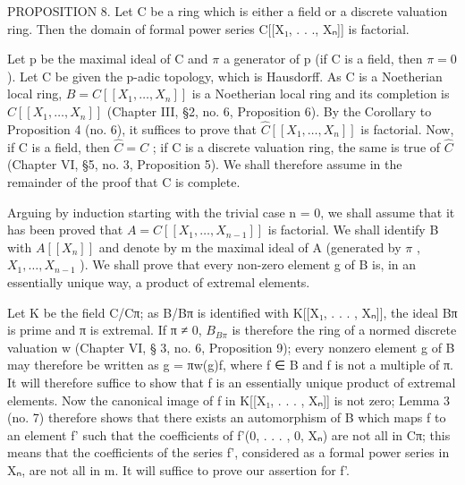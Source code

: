 PROPOSITION 8. Let C be a ring which is either a field or a discrete valuation ring. Then the domain of formal power series C{[}{[}X₁, . . ., Xₙ{]}{]} is factorial.

Let p be the maximal ideal of C and \(\pi\) a generator of p (if C is a field, then \(\pi = 0\) ). Let C be given the p-adic topology, which is Hausdorff. As C is a Noetherian local ring, \(B = C[[X_{1}, \ldots, X_{n}]]\) is a Noetherian local ring and its completion is \(\hat{C}[[X_{1}, \ldots, X_{n}]]\) (Chapter III, §2, no. 6, Proposition 6). By the Corollary to Proposition 4 (no. 6), it suffices to prove that \(\hat{C}[[X_{1}, \ldots, X_{n}]]\) is factorial. Now, if C is a field, then \(\hat{C} = C\) ; if C is a discrete valuation ring, the same is true of \(\hat{C}\) (Chapter VI, §5, no. 3, Proposition 5). We shall therefore assume in the remainder of the proof that C is complete.

Arguing by induction starting with the trivial case n = 0, we shall assume that it has been proved that \(A = C[[X_{1}, \ldots, X_{n-1}]]\) is factorial. We shall identify B with \(A[[X_{n}]]\) and denote by m the maximal ideal of A (generated by \(\pi\) , \(X_{1}, \ldots, X_{n-1}\) ). We shall prove that every non-zero element g of B is, in an essentially unique way, a product of extremal elements.

Let K be the field C/Cπ; as B/Bπ is identified with K{[}{[}X₁, . . . , Xₙ{]}{]}, the ideal Bπ is prime and π is extremal. If π ≠ 0, \(B_{B\pi}\) is therefore the ring of a normed discrete valuation w (Chapter VI, § 3, no. 6, Proposition 9); every nonzero element g of B may therefore be written as g = πw(g)f, where f ∈ B and f is not a multiple of π. It will therefore suffice to show that f is an essentially unique product of extremal elements. Now the canonical image of f in K{[}{[}X₁, . . . , Xₙ{]}{]} is not zero; Lemma 3 (no. 7) therefore shows that there exists an automorphism of B which maps f to an element f' such that the coefficients of f'(0, . . . , 0, Xₙ) are not all in Cπ; this means that the coefficients of the series f', considered as a formal power series in Xₙ, are not all in m. It will suffice to prove our assertion for f'.

